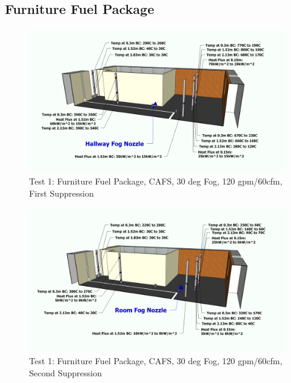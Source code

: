 \documentclass[12pt,oneside]{book}
\begin{document}
\subsection{Furniture Fuel Package}
\label{subsec:Furniture_Fuel_Package}

\begin{figure}[!ht]
	\includegraphics[width=6in]{../Figures/Pictures/Metric/DelCoFogTest1FirstSuppression}
	\caption{Test 1: Furniture Fuel Package, CAFS, 30 deg Fog, 120 gpm/60cfm, First Suppression}
	\label{fig:Test_1_First_Suppression}
\end{figure}

\begin{figure}[!ht]
	\includegraphics[width=6in]{../Figures/Pictures/Metric/DelCoFogTest1SecondSuppression}
	\caption{Test 1: Furniture Fuel Package, CAFS, 30 deg Fog, 120 gpm/60cfm, Second Suppression}
	\label{fig:Test_1_Second_Suppression}
\end{figure}
\end{document}
